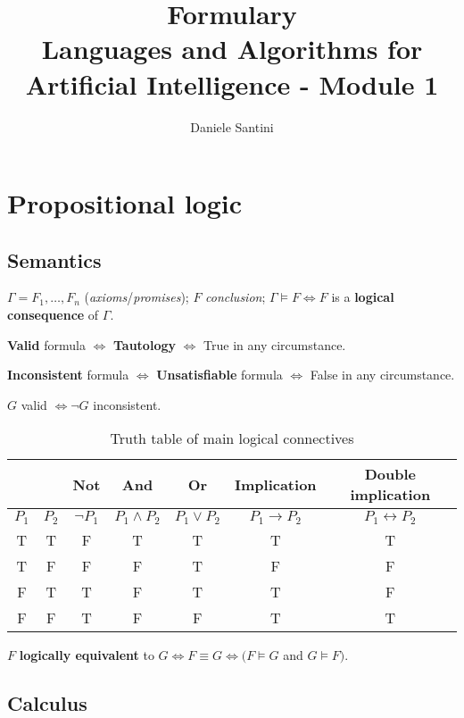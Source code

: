 \documentclass[]{article}
\title{Formulary \\ \large Languages and Algorithms for Artificial Intelligence - Module 1}
\author{Daniele Santini}
\begin{document}

\section{Propositional logic}

\subsection{Semantics}

\noindent $\Gamma = F_1,\dots,F_n$ (\textit{axioms}/\textit{promises});
$F$ \textit{conclusion}; 	
$\Gamma \vDash F \iff F$ is a \textbf{logical consequence} of $\Gamma$.

\noindent \textbf{Valid} formula $\iff$ \textbf{Tautology} $\iff$ True in any circumstance.

\noindent \textbf{Inconsistent} formula $\iff$ \textbf{Unsatisfiable} formula $\iff$ False in any circumstance.

\noindent $G$ valid $\iff \neg G$ inconsistent.

\begin{table}[h]
	\centering
	\caption{Truth table of main logical connectives}
	\begin{tabular}{ |c |c|c | c | c| c | c | } 
		\hline
		 &  & \textbf{Not} & \textbf{And} & \textbf{Or} & \textbf{Implication} & \textbf{Double implication} \\
		\hline
		$P_1$ & $P_2$ & $\neg P_1$ & $P_1 \land P_2$ & $P_1 \lor P_2$ & $P_1 \rightarrow P_2$ & $P_1 \leftrightarrow P_2$ \\
		\hline
		T & T & F & T & T & T & T \\
		\hline
		T & F & F & F & T & F & F \\
		\hline
		F & T & T & F & T & T & F \\
		\hline
		F & F & T & F & F & T & T \\
		\hline
	\end{tabular}
\end{table}

\noindent $F$ \textbf{logically equivalent} to $G \iff F \equiv G \iff (F \vDash G$ and $G \vDash F)$.

\subsection{Calculus}
\end{document}
